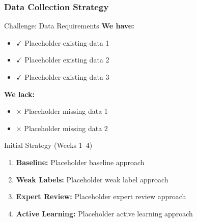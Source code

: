 \begin{frame}
\frametitle{Data Collection Strategy}
\begin{block}{Challenge: Data Requirements}
\textbf{We have:}
\begin{itemize}
\item $\checkmark$ Placeholder existing data 1
\item $\checkmark$ Placeholder existing data 2
\item $\checkmark$ Placeholder existing data 3
\end{itemize}

\textbf{We lack:}
\begin{itemize}
\item $\times$ Placeholder missing data 1
\item $\times$ Placeholder missing data 2
\end{itemize}
\end{block}

\begin{block}{Initial Strategy (Weeks 1--4)}
\begin{enumerate}
\item \textbf{Baseline:} Placeholder baseline approach
\item \textbf{Weak Labels:} Placeholder weak label approach
\item \textbf{Expert Review:} Placeholder expert review approach
\item \textbf{Active Learning:} Placeholder active learning approach
\end{enumerate}
\end{block}
\end{frame}

